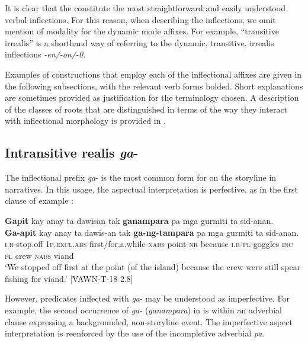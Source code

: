 It is clear that the  constitute the most straightforward and easily understood verbal inflections. For this reason, when describing the inflections, we omit mention of modality for the dynamic mode affixes. For example, “transitive irrealis” is a shorthand way of referring to the dynamic, transitive, irrealis inflections \textit{-en/-on/-0.}

Examples of constructions that employ each of the inflectional affixes are given in the following subsections, with the relevant verb forms bolded. Short explanations are sometimes provided as justification for the terminology chosen. A description of the classes of roots that are distinguished in terms of the way they interact with inflectional morphology is provided in .

\subsection{Intransitive realis \textit{ga}{}-}
\label{bkm:Ref124921711}\label{sec:intransitiverealis} 

The inflectional prefix \textit{ga}{}- is the most common form for  on the storyline in narratives. In this usage, the aspectual interpretation is perfective, as in the first clause of example :

\ea
\label{bkm:Ref396718263}
\textbf{Gapit}  kay  anay  ta  dawisan  tak  \textbf{ganampara} pa  mga  gurmiti  ta  sid-anan. \\\smallskip
 \gll \textbf{Ga-apit}  kay  anay  ta  dawis-an  tak  \textbf{ga-ng-tampara} pa  mga  gurmiti  ta  sid-anan. \\
\textsc{i.r}-stop.off  1\textsc{p.excl.abs}  first/for.a.while  \textsc{nabs}  point-\textsc{nr}  because  \textsc{i.r-pl}-goggles \textsc{inc}  \textsc{pl}  crew  \textsc{nabs}  viand \\
\glt `We stopped off first at the point (of the island) because the crew were still spear fishing for viand.’ [VAWN-T-18 2.8]
\z

However, predicates inflected with \textit{ga}{}- may be understood as imperfective. For example, the second occurrence of \textit{ga-} (\textit{ganampara}) in  is within an adverbial clause expressing a backgrounded, non-storyline event. The imperfective aspect interpretation is reenforced by the use of the incompletive adverbial \textit{pa}.

